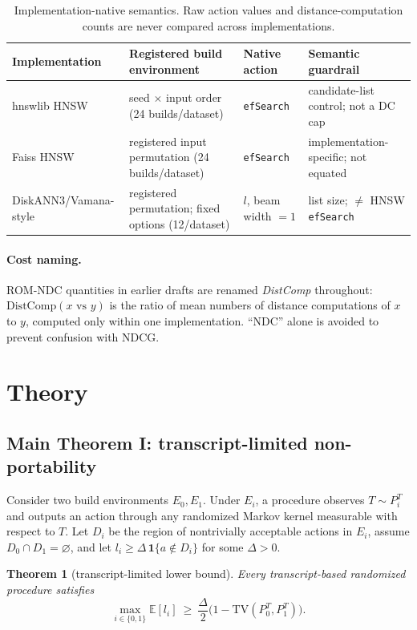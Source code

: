 \documentclass{article}
\newtheorem{theorem}{Theorem}
\newcommand{\DistComp}{\mathrm{DistComp}}
\newcommand{\TV}{\mathrm{TV}}
\newcommand{\E}{\mathbb{E}}
\begin{document}
\begin{table}[t]
\centering
\caption{Implementation-native semantics. Raw action values and distance-computation counts are never
compared across implementations.}
\label{tab:semantics}
\footnotesize
\setlength{\tabcolsep}{4pt}
\begin{tabular}{p{2.4cm}p{3.4cm}p{2.1cm}p{5.2cm}}
\toprule
Implementation & Registered build environment & Native action & Semantic guardrail \\
\midrule
hnswlib HNSW & seed $\times$ input order (24 builds/dataset) & \texttt{efSearch} & candidate-list control; not a DC cap \\
Faiss HNSW & registered input permutation (24 builds/dataset) & \texttt{efSearch} & implementation-specific; not equated \\
DiskANN3/Vamana-style & registered permutation; fixed options (12/dataset) & $l$, beam width $=1$ & list size; $\neq$ HNSW \texttt{efSearch} \\
\bottomrule
\end{tabular}
\end{table}

\paragraph{Cost naming.}
ROM-NDC quantities in earlier drafts are renamed \emph{DistComp} throughout:
$\DistComp(x \text{ vs } y)$ is the ratio of mean numbers of distance computations of $x$ to $y$, computed
only within one implementation. ``NDC'' alone is avoided to prevent confusion with NDCG.

\section{Theory}
\label{sec:theory}

\subsection{Main Theorem I: transcript-limited non-portability}

Consider two build environments $E_0,E_1$. Under $E_i$, a procedure observes $T\sim P_i^{T}$ and outputs an
action through any randomized Markov kernel measurable with respect to $T$. Let $D_i$ be the region of
nontrivially acceptable actions in $E_i$, assume $D_0\cap D_1=\varnothing$, and let
$l_i\ge\Delta\,\mathbf{1}\{a\notin D_i\}$ for some $\Delta>0$.

\begin{theorem}[transcript-limited lower bound]
Every transcript-based randomized procedure satisfies
\begin{equation}
\max_{i\in\{0,1\}}\E[l_{i}]\ \ge\ \frac{\Delta}{2}\bigl(1-\TV(P_{0}^{T},P_{1}^{T})\bigr).
\label{eq:thm1}
\end{equation}
\end{theorem}
\end{document}

